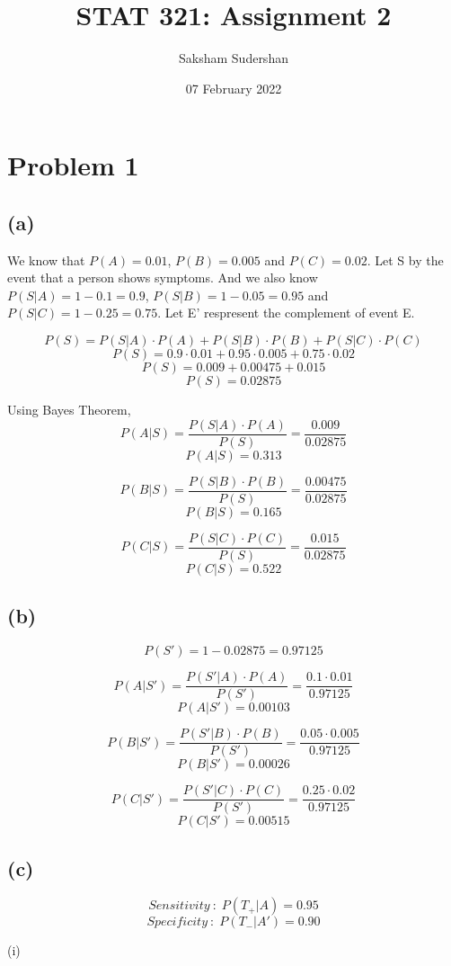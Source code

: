 \documentclass{article}
\title{ STAT 321: Assignment 2}
\author{Saksham Sudershan}
\date{07 February 2022}
\begin{document}
	\maketitle

	\section*{Problem 1}
		\subsection*{(a)}
			We know that $P(A)=0.01$, $P(B)=0.005$ and $P(C)=0.02$.
			Let S by the event that a person shows symptoms. And we also know $P(S|A)=1-0.1=0.9$, $P(S|B)=1-0.05 = 0.95$ and $P(S|C)=1-0.25=0.75$.
			Let E' respresent the complement of event E.


			$$ P(S) = P(S|A) \cdot P(A) + P(S|B) \cdot P(B) +  P(S|C) \cdot P(C) $$
			$$ P(S) = 0.9 \cdot 0.01 + 0.95 \cdot 0.005 + 0.75 \cdot 0.02 $$
			$$ P(S) = 0.009+0.00475+0.015$$
			$$ P(S) = 0.02875 $$


			Using Bayes Theorem,
			$$ P(A|S) = \frac{P(S|A) \cdot P(A)}{P(S)}= \frac{0.009}{0.02875}$$
			$$ P(A|S) = 0.313$$

			
			$$ P(B|S) = \frac{P(S|B) \cdot P(B)}{P(S)}= \frac{0.00475}{0.02875}$$
			$$ P(B|S) = 0.165$$


			$$ P(C|S) = \frac{P(S|C) \cdot P(C)}{P(S)}= \frac{0.015}{0.02875}$$
			$$ P(C|S) = 0.522$$

		\subsection*{(b)}
			$$ P(S') = 1-0.02875=0.97125 $$
			
			$$ P(A|S') = \frac{P(S'|A) \cdot P(A)}{P(S')}= \frac{0.1 \cdot 0.01}{0.97125}$$
			$$ P(A|S') = 0.00103 $$


			$$ P(B|S') = \frac{P(S'|B) \cdot P(B)}{P(S')}= \frac{0.05 \cdot 0.005}{0.97125}$$
			$$ P(B|S') = 0.00026 $$


			$$ P(C|S') = \frac{P(S'|C) \cdot P(C)}{P(S')}= \frac{0.25 \cdot 0.02}{0.97125}$$
			$$ P(C|S') = 0.00515 $$

		\subsection*{(c)}
			$$ Sensitivity\ : \; P(T_{+}|A) = 0.95 $$
			$$Specificity\ : \; P(T_{-}|A') = 0.90 $$

			(i)
\end{document}
